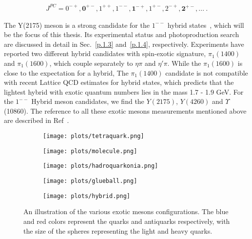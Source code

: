 \begin{equation}
    \label{eq.1.2.2}
    \begin{aligned}
        J^{PC} = 0^{-+}, \bm{0^{+-}}, 1^{++}, 1^{--}, \bm{1^{-+}}, 1^{+-}, 2^{-+}, \bm{2^{+-}},...~.
    \end{aligned}
\end{equation}

The Y(2175) meson is a strong candidate for the $1^{--}$ hybrid states~\cite{Gui07}, which will be the focus of this thesis. Its experimental status and photoproduction search are discussed in detail in Sec.~\ref{p.1.3} and~\ref{p.1.4}, respectively. Experiments have reported two different hybrid candidates with spin-exotic signature, $\pi_{1}(1400)$ and $\pi_{1}(1600)$, which couple separately to $\eta\pi$ and $\eta \prime \pi$. While the $\pi_{1}(1600)$ is close to the expectation for a hybrid, The $\pi_{1}(1400)$ candidate is not compatible with recent Lattice QCD estimates for hybrid states, which predicts that the lightest hybrid with exotic quantum numbers lies in the mass 1.7 - 1.9 GeV. For the $1^{--}$ Hybrid meson candidates, we find the $Y(2175)$, $Y(4260)$ and $\Upsilon$(10860). The reference to all these exotic mesons measurements mentioned above are described in Ref~\cite{Tanabashi18}.

\begin{figure}[H]
    \centering
    \begin{subfigure}[b]{0.2\textwidth}
        \texttt{[image: plots/tetraquark.png]}
        \caption{}
        \label{fig.1.2.2.a}
    \end{subfigure}\hfill
    \begin{subfigure}[b]{0.2\textwidth}
        \texttt{[image: plots/molecule.png]}
        \caption{}
        \label{fig.1.2.2.b}
    \end{subfigure}\hfill
    \begin{subfigure}[b]{0.2\textwidth}
        \texttt{[image: plots/hadroquarkonia.png]}
        \caption{}
        \label{fig.1.2.2.c}
    \end{subfigure}\hfill
    \begin{subfigure}[b]{0.2\textwidth}
        \texttt{[image: plots/glueball.png]}
        \caption{}
        \label{fig.1.2.2.d}
    \end{subfigure}\hfill
    \begin{subfigure}[b]{0.2\textwidth}
        \texttt{[image: plots/hybrid.png]}
        \caption{}
        \label{fig.1.2.2.e}
    \end{subfigure}    
    \caption{An illustration of the various exotic mesons configurations. The blue and red colors represent the quarks and antiquarks respectively, with the size of the spheres representing the light and heavy quarks.}
    \label{fig.1.2.2}
\end{figure}

